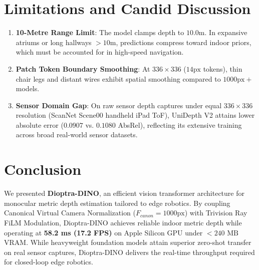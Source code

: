 \documentclass[10pt,twocolumn,letterpaper]{article}
\begin{document}
\section{Limitations and Candid Discussion}

\begin{enumerate}
    \item \textbf{10-Metre Range Limit}: The model clamps depth to $10.0\text{m}$. In expansive atriums or long hallways $>10\text{m}$, predictions compress toward indoor priors, which must be accounted for in high-speed navigation.
    \item \textbf{Patch Token Boundary Smoothing}: At $336 \times 336$ ($14\text{px}$ tokens), thin chair legs and distant wires exhibit spatial smoothing compared to $1000\text{px}+$ models.
    \item \textbf{Sensor Domain Gap}: On raw sensor depth captures under equal $336 \times 336$ resolution (ScanNet Scene00 handheld iPad ToF), UniDepth V2 attains lower absolute error ($0.0907$ vs. $0.1080$ AbsRel), reflecting its extensive training across broad real-world sensor datasets.
\end{enumerate}

\section{Conclusion}

We presented \textbf{Dioptra-DINO}, an efficient vision transformer architecture for monocular metric depth estimation tailored to edge robotics. By coupling Canonical Virtual Camera Normalization ($F_{canon}=1000\text{px}$) with Trivision Ray FiLM Modulation, Dioptra-DINO achieves reliable indoor metric depth while operating at \textbf{58.2 ms (17.2 FPS)} on Apple Silicon GPU under $<240\text{ MB}$ VRAM. While heavyweight foundation models attain superior zero-shot transfer on real sensor captures, Dioptra-DINO delivers the real-time throughput required for closed-loop edge robotics.



\end{document}
